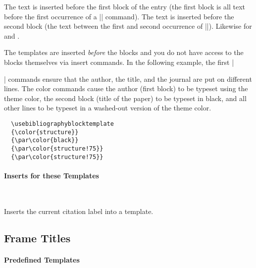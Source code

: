 \begin{command}{\usebibliographyblocktemplate%
    }
  The text  is inserted before the first block of the
  entry (the first block is all text before the first occurrence of a 
  |\newblock| command). The text  is inserted before
  the second block (the text between the first and second occurrence
  of |\newblock|). Likewise for  and . 

  The templates are inserted \emph{before} the blocks and you do not
  have access to the blocks themselves via insert commands. In the
  following example, the first |\par| commands ensure that the
  author, the title, and the journal are put on different lines. The
  color commands cause the author (first block) to be typeset using
  the theme color, the second block (title of the paper) to be typeset
  in black, and all other lines to be typeset in a washed-out version
  of the theme color. 
  \example
\begin{verbatim}
  \usebibliographyblocktemplate
  {\color{structure}}
  {\par\color{black}}
  {\par\color{structure!75}}
  {\par\color{structure!75}}
\end{verbatim}
\end{command}


\paragraph{Inserts for these Templates}\ 

\begin{command}{\insertbiblabel}
  Inserts the current citation label into a template.
\end{command}



\subsection{Frame Titles}

\label{section-continuation}

\paragraph{Predefined Templates}\


